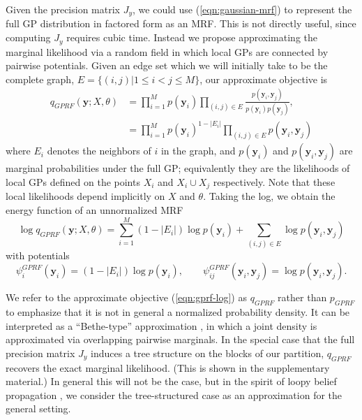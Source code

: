 \documentclass{article}
\renewcommand{\v}[1]{\mathbf{#1}}
\begin{document}
Given the precision matrix $J_y$, we could use
(\ref{eqn:gaussian-mrf}) to represent the full GP distribution in
factored form as an MRF. This is not directly useful, since computing
$J_y$ requires cubic time. Instead we propose approximating the
marginal likelihood via a random field in which local GPs are
connected by pairwise potentials. Given an edge set which we will
initially take to be the complete graph, $E =\{(i,j) | 1\le i < j \le
M\}$, our approximate objective is
\begin{align}
q_{GPRF}(\v{y}; X, \theta)&= \prod_{i=1}^M p(\v{y}_i) 
\prod_{(i,j)\in E} \frac{p(\v{y}_i, \v{y}_j)}{p(\v{y}_i) p(\v{y}_j)},\label{eqn:gprf-naive}\\
&= \prod_{i=1}^M p(\v{y}_i)^{1-|E_i|} \prod_{(i,j)\in E} p(\v{y}_i, \v{y}_j) \nonumber
\end{align}
where $E_i$ denotes the neighbors of $i$ in the graph, and $p(\v{y}_i)$ and $p(\v{y}_{i},
\v{y}_j)$ are marginal probabilities under the full GP;
equivalently they are the likelihoods of local GPs
defined on the points $X_i$ and $X_i \cup X_j$ respectively. Note that
these local likelihoods depend implicitly on $X$ and $\theta$. Taking
the log, we obtain the energy function of an unnormalized MRF
\begin{equation}
\log q_{GPRF}(\v{y}; X, \theta) = \sum_{i=1}^M (1-|E_i|)\log p(\v{y}_i)
 + \sum_{(i,j)\in E} \log p(\v{y}_i, \v{y}_j)  \label{eqn:gprf-log}
\end{equation}
with potentials
\begin{equation}
\psi_i^{GPRF}(\v{y}_i) = (1-|E_i|)\log p(\v{y}_i), \qquad \psi_{ij}^{GPRF}(\v{y}_i, \v{y}_j) =
\log p(\v{y}_i, \v{y}_j).\end{equation}

We refer to the approximate objective (\ref{eqn:gprf-log}) as
$q_{GPRF}$ rather than $p_{GPRF}$ to emphasize that it is not in
general a normalized probability density. It can be interpreted as a
``Bethe-type'' approximation \cite{yedidia2001bethe}, in which a joint
density is approximated via overlapping pairwise marginals. In the
special case that the full precision matrix $J_y$ induces a tree
structure on the blocks of our partition, $q_{GPRF}$ recovers the
exact marginal likelihood. (This is shown in the supplementary material.) In general this will not be the case, but in the spirit of loopy
belief propagation \cite{murphy1999loopy}, we consider the
tree-structured case as an approximation for the general setting.
\end{document}
